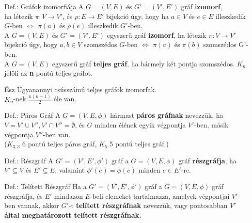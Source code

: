 \documentclass{beamer}
\begin{document}
\begin{frame}

\begin{block}{Def.: Gráfok izomorfiája}
A $G = (V, E)$ és $G' = (V', E')$ gráf \textbf{izomorf},\\
ha létezik ${\pi} : V \rightarrow V'$, és $\rho : E \rightarrow E'$ bijekció úgy, hogy ha $a \in V$ és $e \in E$ illeszkedik $G$-ben $\iff$ ${\pi}(a)$ és ${\rho}(e)$ illeszkedik $G'$-ben.\\
\bigskip
A $G = (V, E)$ és $G' = (V', E')$ egyszerű gráf \textbf{izomorf}, ha létezik ${\pi} : V \rightarrow V'$ bijekció úgy, hogy $a, b \in V$ szomszédos $G$-ben $\iff$ ${\pi}(a)$ és ${\pi}(b)$ szomszédos G'-ben.\\
\bigskip
A $G = (V, E)$ egyszerű gráf \textbf{teljes gráf}, ha bármely két pontja szomszédos. \textbf{$K_n$} jelöli az \textbf{n} pontú teljes gráfot.
\end{block}

\begin{block}{Ész}
Ugyanannyi csússzámú teljes gráfok izomorfak.\\
\bigskip
$K_n$-nek $\frac{n(n - 1)}{2}$ éle van.
\end{block}
\end{frame}

\begin{frame}

\begin{block}{Def.: Páros Gráf}
A $G = (V, E, {\phi})$ hármast \textbf{páros gráfnak} nevezzük, ha $V = V' \cup V'', V' \cap V'' = \emptyset$, és $G$ minden élének egyik végpontja $V'$-ben, másik végpontja $V''$-ben van.\\
\medskip
($K_{3, 3}$ 6 pontú teljes páros gráf, $K_5$ 5 pontú teljes gráf.)
\end{block}
\begin{block}{Def.: Részgráf}
A $G' = (V', E', {\phi}')$ gráf a $G = (V, E, {\phi})$ gráf \textbf{részgráfja}, ha\\
$V' \subseteq V$ és $E' \subseteq E$, valamint ${\phi}'(e) = {\phi}(e)$ minden $e \in E'$-re.
\end{block}
\begin{block}{Def.: Telített Részgráf}
Ha a $G' = (V', E', {\phi}')$ gráf a $G = (V, E, {\phi})$ gráf részgráfja, és $E'$ mindazon $E$-beli elemeket tartalmazza, amelyek végpontjai $V'$-ben vannak, akkor $G'$-t \textbf{telített részgráfnak} nevezzük, vagy pontosabban \textbf{$V'$ által meghatározott telített részgráfnak.}
\end{block}

\end{frame}
\end{document}
